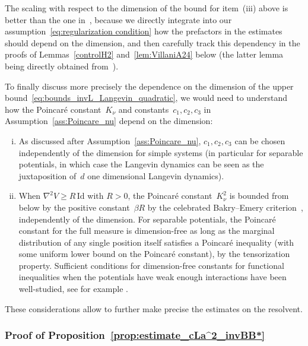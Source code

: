 \documentclass{article}
\renewcommand{\geq}{\geqslant}
\begin{document}
The scaling with respect to the dimension of the bound for item~(iii) above is better than the one in~\cite{CLW19}, because we directly integrate into our assumption~\eqref{eq:regularization condition} how the prefactors in the estimates should depend on the dimension, and then carefully track this dependency in the proofs of Lemmas~\ref{controlH2} and~\ref{lem:VillaniA24} below (the latter lemma being directly obtained from~\cite[Lemma~A.24]{Villani09}).

\medskip

To finally discuss more precisely the dependence on the dimension of the upper bound~\eqref{eq:bounds_invL_Langevin_quadratic}, we would need to understand how the Poincar\'e constant~$K_\nu$ and constants~$c_1,c_2,c_3$ in Assumption~\ref{ass:Poincare_nu} depend on the dimension:
\begin{enumerate}[(i)]
\item As discussed after Assumption~\ref{ass:Poincare_nu}, $c_1,c_2,c_3$ can be chosen independently of the dimension for simple systems (in particular for separable potentials, in which case the Langevin dynamics can be seen as the juxtaposition of~$d$ one dimensional Langevin dynamics).
\item When $\nabla^2 V \geq R \, \mathrm{Id}$ with $R > 0$, the Poincar\'e constant~$K_\nu^2$ is bounded from below by the positive constant~$\beta R$ by the celebrated Bakry--Emery criterion~\cite{BE85}, independently of the dimension. For separable potentials, the Poincar\'e constant for the full measure is dimension-free as long as the marginal distribution of any single position itself satisfies a Poincar\'e inequality (with some uniform lower bound on the Poincar\'e constant), by the tensorization property. Sufficient conditions for dimension-free constants for functional inequalities when the potentials have weak enough interactions have been well-studied, see for example \cite{yos2001, otto2007}. 
\end{enumerate}
These considerations allow to further make precise the estimates on the resolvent.

\subsubsection{Proof of Proposition~\ref{prop:estimate_cLa^2_invBB*}}
\label{sec:proof_prop:estimate_cLa^2_invBB*}
\end{document}
